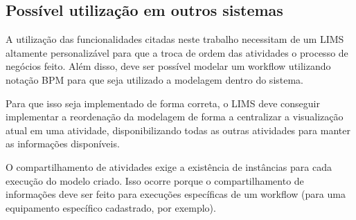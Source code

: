 \subsection{Possível utilização em outros sistemas}

A utilização das funcionalidades citadas neste trabalho necessitam de um LIMS altamente personalizável para que a troca de ordem das atividades o processo de negócios feito. Além disso, deve ser possível modelar um workflow utilizando notação BPM para que seja utilizado a modelagem dentro do sistema.

Para que isso seja implementado de forma correta, o LIMS deve conseguir implementar a reordenação da modelagem de forma a centralizar a visualização atual em uma atividade, disponibilizando todas as outras atividades para manter as informações disponíveis.

O compartilhamento de atividades exige a existência de instâncias para cada execução do modelo criado. Isso ocorre porque o compartilhamento de informações deve ser feito para execuções específicas de um workflow (para uma equipamento específico cadastrado, por exemplo).

